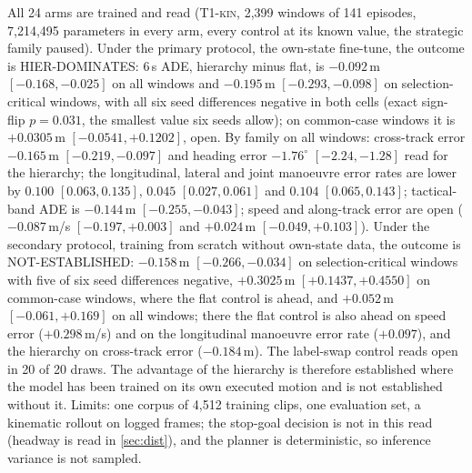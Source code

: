 \documentclass[10pt,twocolumn]{article}
\makeatletter
\theoremstyle{remark}
\newcommand{\tier}[1]{\textsc{\small #1}}
\renewcommand\paragraph{\@startsection{paragraph}{4}{\z@}{1.6ex \@plus .5ex \@minus .2ex}{-1em}{\normalfont\normalsize\bfseries}}
\makeatother
\begin{document}
\paragraph{The six-seed replicate.} All 24 arms are trained and read (\tier{T1-kin}, 2,399 windows of 141 episodes, 7,214,495 parameters in
every arm, every control at its known value, the strategic family paused). Under the primary protocol, the own-state fine-tune, the
outcome is HIER-DOMINATES: 6\,s ADE, hierarchy minus flat, is $-0.092$\,m $[-0.168,-0.025]$ on all windows and $-0.195$\,m
$[-0.293,-0.098]$ on selection-critical windows, with all six seed differences negative in both cells (exact sign-flip $p=0.031$, the
smallest value six seeds allow); on common-case windows it is $+0.0305$\,m $[-0.0541,+0.1202]$, open. By family on all windows:
cross-track error $-0.165$\,m $[-0.219,-0.097]$ and heading error $-1.76^\circ$ $[-2.24,-1.28]$ read for the hierarchy; the
longitudinal, lateral and joint manoeuvre error rates are lower by $0.100$ $[0.063,0.135]$, $0.045$ $[0.027,0.061]$ and $0.104$
$[0.065,0.143]$; tactical-band ADE is $-0.144$\,m $[-0.255,-0.043]$; speed and along-track error are open ($-0.087$\,m/s
$[-0.197,+0.003]$ and $+0.024$\,m $[-0.049,+0.103]$). Under the secondary protocol, training from scratch without own-state data, the
outcome is NOT-ESTABLISHED: $-0.158$\,m $[-0.266,-0.034]$ on selection-critical windows with five of six seed differences negative,
$+0.3025$\,m $[+0.1437,+0.4550]$ on common-case windows, where the flat control is ahead, and $+0.052$\,m $[-0.061,+0.169]$ on all
windows; there the flat control is also ahead on speed error ($+0.298$\,m/s) and on the longitudinal manoeuvre error rate ($+0.097$),
and the hierarchy on cross-track error ($-0.184$\,m). The label-swap control reads open in 20 of 20 draws. The advantage of the
hierarchy is therefore established where the model has been trained on its own executed motion and is not established without it.
Limits: one corpus of 4,512 training clips, one evaluation set, a kinematic rollout on logged frames; the stop-goal
decision is not in this read (headway is read in \cref{sec:dist}), and the planner is deterministic, so inference variance is not sampled.
\end{document}
